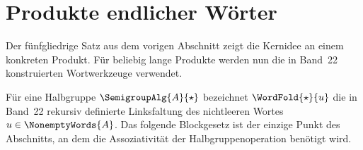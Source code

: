 \documentclass[main.tex]{subfiles}
\begin{document}
\section{Produkte endlicher Wörter}

Der fünfgliedrige Satz aus dem vorigen Abschnitt zeigt die Kernidee an einem
konkreten Produkt. Für beliebig lange Produkte werden nun die in Band~22
konstruierten Wortwerkzeuge verwendet.

Für eine Halbgruppe \(\SemigroupAlg{A}{\star}\) bezeichnet
\(\WordFold{\star}{u}\) die in Band~22 rekursiv definierte Linksfaltung des
nichtleeren Wortes \(u\in\NonemptyWords{A}\). Das folgende Blockgesetz ist
der einzige Punkt des Abschnitts, an dem die Assoziativität der
Halbgruppenoperation benötigt wird.

\begin{tabproofwide}
\end{tabproofwide}
\end{document}
